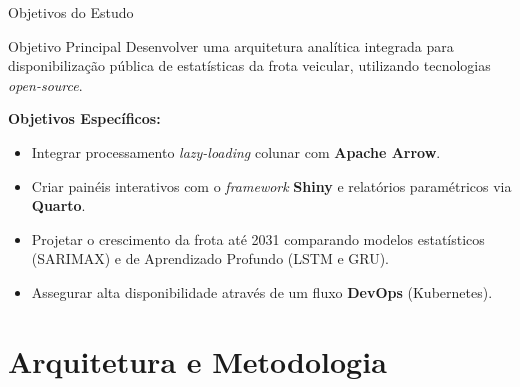 \documentclass[10pt, aspectratio=169]{beamer}
\begin{document}
\begin{frame}{Objetivos do Estudo}
    \begin{block}{Objetivo Principal}
        Desenvolver uma arquitetura analítica integrada para disponibilização pública de estatísticas da frota veicular, utilizando tecnologias \textit{open-source}.
    \end{block}
    
    \vspace{0.3cm}
    \textbf{Objetivos Específicos:}
    \begin{itemize}
        \item Integrar processamento \textit{lazy-loading} colunar com \textbf{Apache Arrow}.
        \item Criar painéis interativos com o \textit{framework} \textbf{Shiny} e relatórios paramétricos via \textbf{Quarto}.
        \item Projetar o crescimento da frota até 2031 comparando modelos estatísticos (SARIMAX) e de Aprendizado Profundo (LSTM e GRU).
        \item Assegurar alta disponibilidade através de um fluxo \textbf{DevOps} (Kubernetes).
    \end{itemize}
\end{frame}

\section{Arquitetura e Metodologia}
\end{document}
